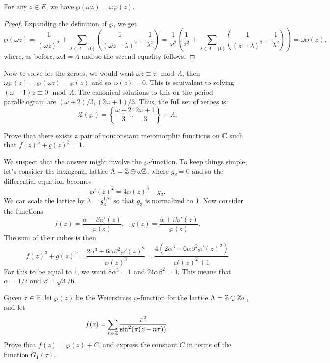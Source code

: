 \documentclass{pset}
\begin{document}
\begin{parts}
  \begin{claim}
    For any $z\in E$, we have $\wp(\omega z) = \omega\wp(z)$.
  \end{claim}
  \begin{proof}
    Expanding the definition of $\wp$, we get
    \[
      \wp(\omega z) = \frac{1}{(\omega z)^2}+\sum_{\lambda\in \Lambda -\{0\}}\left(\frac{1}{(\omega z-\lambda)^2}-\frac{1}{\lambda^2}\right) 
      = \frac{1}{\omega^2}\left(\frac{1}{z^2}+\sum_{\lambda\in \Lambda -\{0\}}\left(\frac{1}{(z-\lambda)^2}-\frac{1}{\lambda^2}\right)\right) =\omega\wp(z),
    \]
    where, as before, $\omega \Lambda = \Lambda$ and so the second equality follows.
  \end{proof}

  Now to solve for the zeroes, we would want $\omega z \equiv z\mod \Lambda$, then $\omega \wp(z) = \wp(\omega z) = \wp(z)$ and so $\wp(z)=0$. This is equivalent to solving $(\omega - 1)z\equiv 0 \mod \Lambda$. The canonical solutions to this on the period parallelogram are $(\omega+2)/3, (2\omega + 1)/3$. Thus, the full set of zeroes is:
  \[
    \mathcal{Z}(\wp) = \left\{\frac{\omega+2}{3}, \frac{2\omega+1}{3}\right\} + \Lambda.
  \]
\end{parts}

\begin{problem}{5.6}
  Prove that there exists a pair of nonconstant meromorphic functions on $\mathbb{C}$ such that $f(z)^3+g(z)^3=1$. %
\end{problem}

\begin{solution}
  We suspect that the answer might involve the $\wp$-function. To keep things simple, let's consider the hexagonal lattice $\Lambda = \mathbb{Z} \oplus \omega \mathbb{Z}$, where $g_2=0$ and so the differential equation becomes
  \[
    \wp'(z)^2 = 4\wp(z)^3 - g_3.
  \]
  We can scale the lattice by $\lambda = g_3^{1/6}$ so that $g_3$ is normalized to $1$. Now consider the functions
  \[
    f(z) = \frac{\alpha - \beta \wp'(z)}{\wp(z)}, \quad g(z)=\frac{\alpha + \beta\wp'(z)}{\wp(z)}.
  \]
  The sum of their cubes is then
  \[
    f(z)^3 + g(z)^3 = \frac{2\alpha^3 + 6\alpha\beta^2 \wp'(z)^2}{\wp(z)^3} = \frac{4(2\alpha^3 + 6\alpha\beta^2\wp'(z)^2)}{\wp'(z)^2 + 1}
  \]
  For this to be equal to $1$, we want $8\alpha^3 = 1$ and $24\alpha\beta^2 = 1$. This means that $\alpha = 1/2$ and $\beta = \sqrt{3}/6$.
\end{solution}

\begin{problem}{5.8}
  Given $\tau\in \mathbb{H}$ let $\wp(z)$ be the Weierstrass $\wp$-function for the lattice $\Lambda = \mathbb{Z}\oplus \mathbb{Z}\tau$, and let 
  \[
    f(z) = \sum_{n\in \mathbb{Z}}\frac{\pi^2}{\sin^2(\pi(z-n\tau))}.
  \]
  Prove that $f(z)=\wp(z) + C$, and express the constant $C$ in terms of the function $G_1(\tau)$.
\end{problem}
\end{document}
